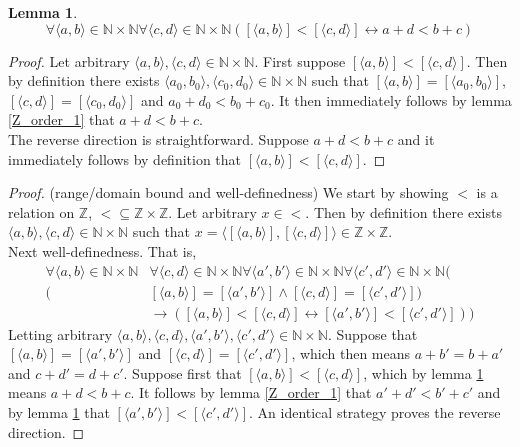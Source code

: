 \documentclass{report}
\newtheorem{lemma}[theo]{Lemma}
\begin{document}
\begin{lemma}\label{Z_order_2}
\begin{equation*}
\forall\langle a,b\rangle\in\mathbb N\times\mathbb N\forall\langle c,d\rangle\in\mathbb N\times\mathbb N([\langle a,b\rangle]<[\langle c,d\rangle]\leftrightarrow a+d<b+c)
\end{equation*}
\end{lemma}
\begin{proof}
Let arbitrary $\langle a,b\rangle,\langle c,d\rangle\in\mathbb N\times\mathbb N$. First suppose $[\langle a,b\rangle]<[\langle c,d\rangle]$. Then by definition
there exists $\langle a_0,b_0\rangle,\langle c_0,d_0\rangle\in\mathbb N\times\mathbb N$ such that 
$[\langle a,b\rangle]=[\langle a_0,b_0\rangle]$, $[\langle c,d\rangle]=[\langle c_0,d_0\rangle]$ and $a_0+d_0<b_0+c_0$. It then immediately follows by lemma \ref{Z_order_1} that 
$a+d<b+c$.\\
\indent The reverse direction is straightforward. Suppose $a+d<b+c$ and it immediately follows by definition
that $[\langle a,b\rangle]<[\langle c,d\rangle]$.
\end{proof}
\begin{proof}(range/domain bound and well-definedness)
We start by showing $<$ is a relation on $\mathbb Z$, $<\subseteq\mathbb Z\times\mathbb Z$.
Let arbitrary $x\in<$. Then by definition there exists $\langle a,b\rangle,\langle c,d\rangle\in\mathbb N\times\mathbb N$ such that 
$x=\langle[\langle a,b\rangle],[\langle c,d\rangle]\rangle\in\mathbb Z\times\mathbb Z$.\\
\indent Next well-definedness. That is,
\begin{align*}
\forall\langle a,b\rangle\in\mathbb N\times\mathbb N&\forall\langle c,d\rangle\in\mathbb N\times\mathbb N\forall\langle a',b'\rangle\in\mathbb N\times\mathbb N
\forall\langle c',d'\rangle\in\mathbb N\times\mathbb N(\\(&[\langle a,b\rangle]=[\langle a',b'\rangle]\land[\langle c,d\rangle]=
[\langle c',d'\rangle])\\
&\to([\langle a,b\rangle]<[\langle c,d\rangle]\leftrightarrow[\langle a',b'\rangle]<[\langle c',d'\rangle]))
\end{align*}
Letting arbitrary $\langle a,b\rangle,\langle c,d\rangle,\langle a',b'\rangle,\langle c',d'\rangle\in\mathbb N\times\mathbb N$. Suppose that 
$[\langle a,b\rangle]=[\langle a',b'\rangle]$ and $[\langle c,d\rangle]=[\langle c',d'\rangle]$, which then means $a+b'=b+a'$ and $c+d'=d+c'$. Suppose first that 
$[\langle a,b\rangle]<[\langle c,d\rangle]$, which by lemma \ref{Z_order_2} means $a+d<b+c$. It follows by lemma \ref{Z_order_1} that $a'+d'<b'+c'$ and by lemma \ref{Z_order_2} that
$[\langle a',b'\rangle]<[\langle c',d'\rangle]$. An identical strategy proves the reverse direction.
\end{proof}
\end{document}
